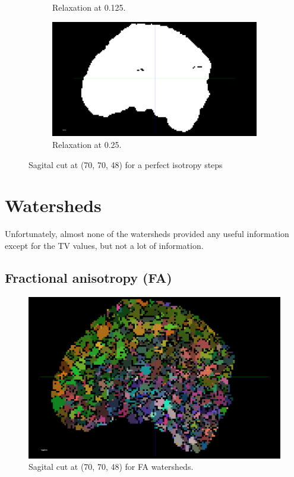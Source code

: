 \documentclass[a4paper,11pt]{report}
\begin{document}
\begin{figure}[H]
\begin{subfigure}[t]{.49\textwidth}
          \caption{Relaxation at 0.125.}
          \label{subfig:perf-iso-0125}
        \end{subfigure}\hfill%
        \begin{subfigure}[t]{.49\textwidth}
          \includegraphics[width=1\linewidth]{imgs/eg_00_00_00_025.png}
          \caption{Relaxation at 0.25.}
          \label{subfig:perf-iso-025}
        \end{subfigure}

        \caption{Sagital cut at (70, 70, 48) for a perfect isotropy steps}
      \end{figure}

  \section{Watersheds}
    Unfortunately, almost none of the watersheds provided any useful information except for the TV values, but not a lot of information.

    \subsection{Fractional anisotropy (FA)}
    \begin{figure}[H]
      \includegraphics[width=1\linewidth]{imgs/fa_watersheds.png}
      \caption{Sagital cut at (70, 70, 48) for FA watersheds.}
      \label{fig:fa_watersheds}
    \end{figure}
\end{document}
